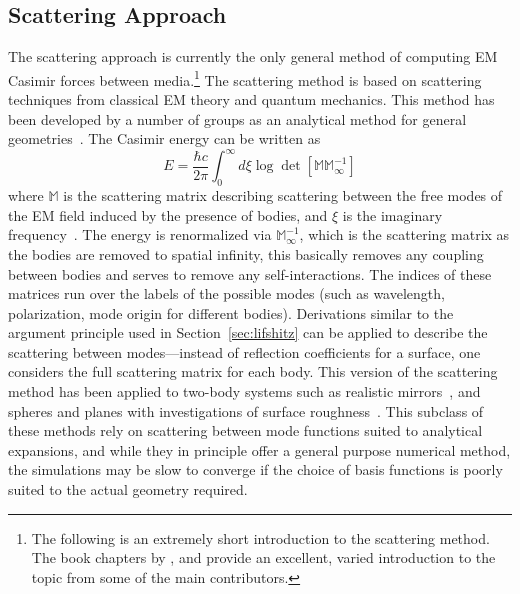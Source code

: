 \subsection{Scattering Approach}
\label{sec:scattering}
The scattering approach is currently the only general method of computing 
EM Casimir forces between media.\footnote{The following is an extremely short introduction to the scattering
method.  The book chapters by \citet{Lambrecht2011}, \citet{Rahi2011} and \citet{Johnson2011} 
provide an excellent, varied introduction to the topic from some of the main contributors.}
The scattering method 
is based on scattering techniques from classical EM theory and quantum mechanics. %
This method has been developed by a number of groups as an analytical method for general geometries~\citep{Emig2004, Lambrecht2006,
Kenneth2006, Emig2007,
MaiaNeto2008,Canaguier-Durand2012,Rahi2009}.  
The Casimir energy can be written as 
\begin{equation}
  E = \frac{\hbar c}{2\pi}\int_{0}^\infty d\xi \log\det[\mathbb{M}\mathbb{M}^{-1}_{\infty}]
  \label{eq:scattering}
\end{equation}
where $\mathbb{M}$ is the scattering matrix describing scattering between the free modes of the EM
field induced by the presence of bodies, and $\xi$ is the imaginary frequency~\citep{Rahi2009}.
The energy is renormalized via $\mathbb{M}^{-1}_\infty$,
which is the scattering matrix as the bodies are removed to spatial infinity, this basically removes any
coupling between bodies and serves to remove any self-interactions. 
The indices of these matrices run over the labels of the possible modes (such as wavelength, polarization, mode origin for different bodies).
Derivations similar to the argument principle used in Section~\ref{sec:lifshitz} can be applied to describe the scattering 
between modes---instead of reflection coefficients for a surface, one considers the full scattering matrix for each body.
This version of the scattering method has been applied to two-body systems such as realistic mirrors~\citep{Lambrecht2006}, 
and spheres and planes with investigations of surface roughness~\citep{Canaguier-Durand2012}.   
This subclass of these methods rely on scattering between mode functions suited to analytical expansions,
 and while they in principle offer a general purpose numerical method, 
the simulations may be slow to converge if the choice of basis functions is poorly suited to the actual
geometry required.  

